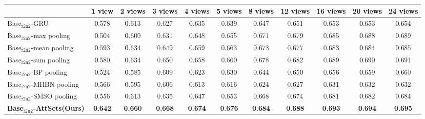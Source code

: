 \documentclass[twocolumn]{svjour3}    \pdfoutput=1
\newcommand{\nickname}{AttSets}
\begin{document}
\begin{table*}[t]
\caption{Group 4: mean IoU for multi-view reconstruction of all 13 categories in ShapeNet$_{\textrm{r2n2}}$ testing split. All networks are firstly trained given only 1 image for each object in Stage 1. The \nickname{} module is further trained given \textbf{24 images} per object in Stage 2, while other competing approaches are fine-tuned given \textbf{24 images} per object in Stage 2.}
\centering
\label{tab:iou_r2n2_24v}
\tabcolsep=0.125cm
\begin{tabular}{ l|cccccccccc}
\hline
&1 view&2 views&3 views& 4 views&5 views&8 views&12 views&16 views&20 views&24 views \\
\hline
Base$_{\textrm{r2n2}}$-GRU &0.578 &0.613&0.627&0.635&0.639&0.647&0.651&0.653&0.653&0.654 \\
Base$_{\textrm{r2n2}}$-max pooling &0.504&0.600&0.631&0.648&0.655&0.671&0.679&0.685&0.688&0.689 \\
Base$_{\textrm{r2n2}}$-mean pooling &0.593&0.634&0.649&0.659&0.663&0.673&0.677&0.683&0.684&0.685 \\
Base$_{\textrm{r2n2}}$-sum pooling &0.580&0.634&0.650&0.658&0.660&0.678&0.682&0.689&0.690&0.691 \\
Base$_{\textrm{r2n2}}$-BP pooling &0.524&0.585&0.609&0.623&0.630&0.644&0.650&0.656&0.659&0.660 \\
Base$_{\textrm{r2n2}}$-MHBN pooling &0.566&0.595&0.606&0.613&0.616&0.624&0.627&0.631&0.632&0.632 \\
Base$_{\textrm{r2n2}}$-SMSO pooling &0.556&0.613&0.635&0.647&0.653&0.668&0.674&0.681&0.682&0.684 \\
\textbf{Base$_{\textrm{r2n2}}$-\nickname{}(Ours)} &\textbf{0.642}&\textbf{0.660}&\textbf{0.668}&\textbf{0.674}&\textbf{0.676}&\textbf{0.684}
&\textbf{0.688}&\textbf{0.693}&\textbf{0.694}&\textbf{0.695} \\
\hline
\end{tabular}
\vspace{-0.1 cm}
\end{table*}
\end{document}
